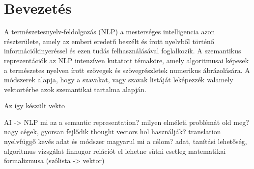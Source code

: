 \chapter{Bevezetés} %
\label{ch:intro}

A természetesnyelv-feldolgozás (NLP) a mesterséges intelligencia azon részterülete, amely az emberi eredetű beszélt és írott nyelvből történő információkinyeréssel és ezen tudás felhasználásával foglalkozik. A szemantikus reprezentációk az NLP intenzíven kutatott témaköre, amely algoritmusai képesek a természetes nyelven írott szövegek és szövegrészletek numerikus ábrázolására. A módszerek alapja, hogy a szavakat, vagy szavak listáját leképezzék valamely vektortérbe azok szemantikai tartalma alapján.

Az így készült vekto

\pagebreak

AI -> NLP
mi az a semantic representation?
milyen elméleti problémát old meg?
nagy cégek, gyorsan fejlődik
thought vectors
hol használják?
translation
nyelvfüggő
kevés adat és módszer magyarul
mi a célom? 
adat, tanítási lehetőség, algoritmus vizsgálat
finnugor relációt el lehetne sütni
esetleg matematikai formalizmusa (szólista -> vektor)

